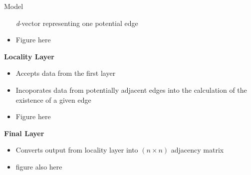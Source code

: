 \documentclass[12pt]{article}
\begin{document}
\begin{posterbard}
\begin{posterboxtitle}{Model}
\begin{itemize}
				\textit{d}-vector representing one potential edge
			\item Figure here
		\end{itemize}
		\noindent\textbf{Locality Layer}
		\begin{itemize}
			\item Accepts data from the first layer
			\item Incoporates data from potentially adjacent edges into the 
				calculation of the existence of a given edge
			\item Figure here
		\end{itemize}
		\noindent\textbf{Final Layer}
		\begin{itemize}
			\item Converts output from locality layer into $(n \times n)$ 
				adjacency matrix
			\item figure also here
		\end{itemize}
	\end{posterboxtitle}


\end{posterbard}
\end{document}
